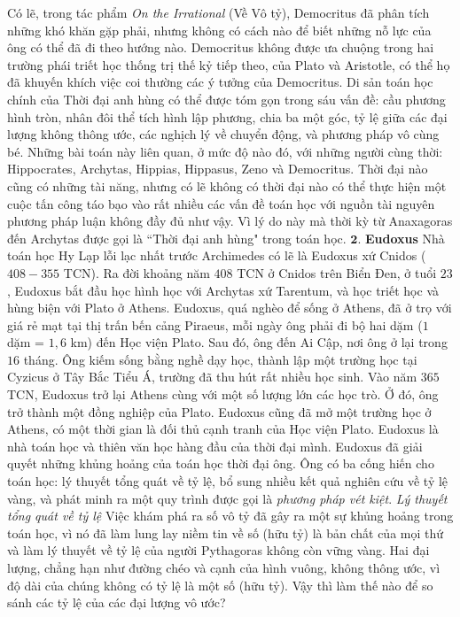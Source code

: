 \begin{multicols}{2}
	\vskip 0.1cm
	Có lẽ, trong tác phẩm \textit{On the Irrational} (Về Vô tỷ), Democritus đã phân tích những khó khăn gặp phải, nhưng không có cách nào để biết những nỗ lực của ông có thể đã đi theo hướng nào.
	\vskip 0.1cm
	Democritus không được ưa chuộng trong hai trường phái triết học thống trị thế kỷ tiếp theo, của Plato và Aristotle, có thể họ đã khuyến khích việc coi thường các ý tưởng của Democritus. 
	\vskip 0.1cm
	Di sản toán học chính của Thời đại anh hùng có thể được tóm gọn trong sáu vấn đề: cầu phương hình tròn, nhân đôi thể tích hình lập phương, chia ba một góc, tỷ lệ giữa các đại lượng không thông ước, các nghịch lý về chuyển động, và phương pháp vô cùng bé. 
	\vskip 0.1cm
	Những bài toán này liên quan, ở mức độ nào đó, với những người cùng thời: Hippocrates, Archytas, Hippias, Hippasus, Zeno và Democritus. 
	\vskip 0.1cm
	Thời đại nào cũng có những tài năng, nhưng có lẽ không có thời đại nào có thể thực hiện một cuộc tấn công táo bạo vào rất nhiều các vấn đề toán học với nguồn tài nguyên phương pháp luận không đầy đủ như vậy. Vì lý do này mà thời kỳ từ Anaxagoras đến Archytas được gọi là ``Thời đại anh hùng" trong toán học.
	\vskip 0.1cm
	$\pmb{2.}$ \textbf{\color{lichsutoanhoc}Eudoxus}
	\vskip 0.1cm
	 Nhà toán học Hy Lạp lỗi lạc nhất trước Archimedes có lẽ là Eudoxus xứ Cnidos ($408 - 355$ TCN).
	 \vskip 0.1cm
	Ra đời khoảng năm $408$ TCN ở Cnidos trên Biển Đen, ở tuổi $23$, Eudoxus bắt đầu học hình học với Archytas xứ Tarentum, và học triết học và hùng biện với Plato ở Athens. Eudoxus, quá nghèo để sống ở Athens, đã ở trọ với giá rẻ mạt tại thị trấn bến cảng Piraeus, mỗi ngày ông phải đi bộ hai dặm ($1$ dặm = $1{,}6$ km) đến Học viện Plato. Sau đó, ông đến Ai Cập, nơi ông ở lại trong $16$ tháng. Ông kiếm sống bằng nghề dạy học, thành lập một trường học tại Cyzicus ở Tây Bắc Tiểu Á, trường đã thu hút rất nhiều học sinh. Vào năm $365$ TCN, Eudoxus trở lại Athens cùng với một số lượng lớn các học trò. Ở đó, ông trở thành một đồng nghiệp của Plato.
	Eudoxus cũng đã mở một trường học ở Athens, có một thời gian là đối thủ cạnh tranh của Học viện Plato.
	\vskip 0.1cm
	Eudoxus là nhà toán học và thiên văn học hàng đầu của thời đại mình. Eudoxus đã giải quyết những khủng hoảng của toán học thời đại ông. Ông có ba cống hiến cho toán học: lý thuyết tổng quát về tỷ lệ, bổ sung nhiều kết quả nghiên cứu về tỷ lệ vàng, và phát minh ra một quy trình được gọi là \textit{phương pháp vét kiệt}.
	\vskip 0.1cm 
	\textit{\color{lichsutoanhoc}Lý thuyết tổng quát về tỷ lệ} 
	\vskip 0.1cm
	Việc khám phá ra số vô tỷ đã gây ra một sự khủng hoảng trong toán học, vì nó đã làm lung lay niềm tin về số (hữu tỷ) là bản chất của mọi thứ và làm lý thuyết về tỷ lệ của người Pythagoras không còn vững vàng. Hai đại lượng, chẳng hạn như đường chéo và cạnh của hình vuông, không thông ước, vì độ dài của chúng không có tỷ lệ là một số (hữu tỷ). Vậy thì làm thế nào để so sánh các tỷ lệ của các đại lượng vô ước?

\end{multicols}
